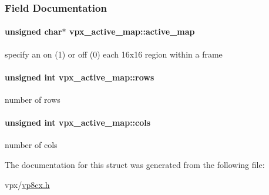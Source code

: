 \subsubsection{\-Field \-Documentation}
\hypertarget{structvpx__active__map_a6e5e092e766ae3f65d280c68c9f6df82}{
\paragraph[{active\-\_\-map}]{\setlength{\rightskip}{0pt plus 5cm}unsigned char$\ast$ {\bf vpx\-\_\-active\-\_\-map\-::active\-\_\-map}}}\label{structvpx__active__map_a6e5e092e766ae3f65d280c68c9f6df82}
specify an on (1) or off (0) each 16x16 region within a frame \hypertarget{structvpx__active__map_a29424c92ff201f97db9bf62d16dfab4d}{
\paragraph[{rows}]{\setlength{\rightskip}{0pt plus 5cm}unsigned int {\bf vpx\-\_\-active\-\_\-map\-::rows}}}\label{structvpx__active__map_a29424c92ff201f97db9bf62d16dfab4d}
number of rows \hypertarget{structvpx__active__map_a310edb5efc62d596b2c276e3f7d1b42a}{
\paragraph[{cols}]{\setlength{\rightskip}{0pt plus 5cm}unsigned int {\bf vpx\-\_\-active\-\_\-map\-::cols}}}\label{structvpx__active__map_a310edb5efc62d596b2c276e3f7d1b42a}
number of cols 

\-The documentation for this struct was generated from the following file\-:\begin{DoxyCompactItemize}
\item 
vpx/\hyperlink{vp8cx_8h}{vp8cx.\-h}\end{DoxyCompactItemize}
